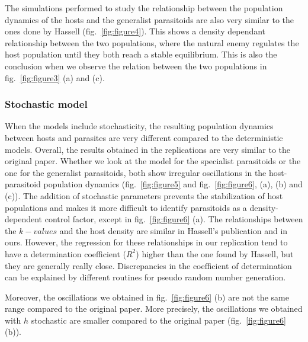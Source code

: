 \documentclass[10pt,a4paper,onecolumn]{article}
\begin{document}
The simulations performed to study the relationship between the
population dynamics of the hosts and the generalist parasitoids are also
very similar to the ones done by Hassell (fig.~\ref{fig:figure4}). This
shows a density dependant relationship between the two populations,
where the natural enemy regulates the host population until they both
reach a stable equilibrium. This is also the conclusion when we observe
the relation between the two populations in fig.~\ref{fig:figure3} (a)
and (c).

\hypertarget{stochastic-model}{%
\subsubsection{Stochastic model}\label{stochastic-model}}

When the models include stochasticity, the resulting population dynamics
between hosts and parasites are very different compared to the
deterministic models. Overall, the results obtained in the replications
are very similar to the original paper. Whether we look at the model for
the specialist parasitoids or the one for the generalist parasitoids,
both show irregular oscillations in the host-parasitoid population
dynamics (fig.~\ref{fig:figure5} and fig.~\ref{fig:figure6}, (a), (b)
and (c)). The addition of stochastic parameters prevents the
stabilization of host populations and makes it more difficult to
identify parasitoids as a density-dependent control factor, except in
fig.~\ref{fig:figure6} (a). The relationships between the \(k-values\)
and the host density are similar in Hassell's publication and in ours.
However, the regression for these relationships in our replication tend
to have a determination coefficient (\(R^2\)) higher than the one found
by Hassell, but they are generally really close. Discrepancies in the
coefficient of determination can be explained by different routines for
pseudo random number generation.

Moreover, the oscillations we obtained in fig.~\ref{fig:figure6} (b) are
not the same range compared to the original paper. More precisely, the
oscillations we obtained with \(h\) stochastic are smaller compared to
the original paper (fig.~\ref{fig:figure6} (b)).
\end{document}
